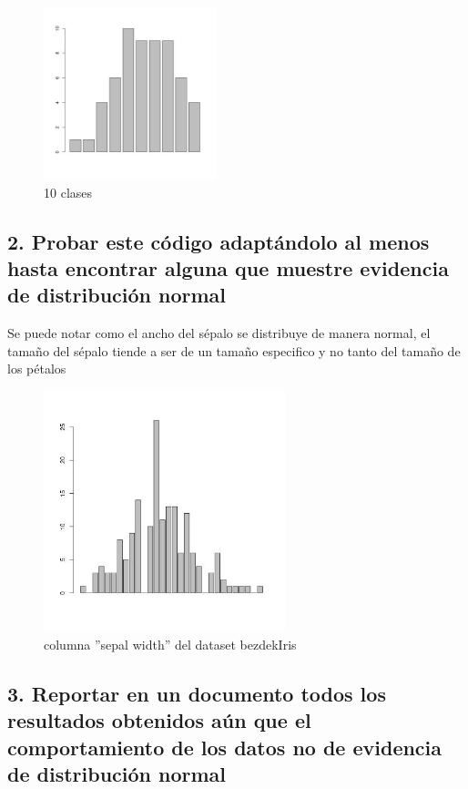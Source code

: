 \documentclass[10pt]{article}
\begin{document}
\begin{figure}[htbp]
\centering
\includegraphics[width=5cm]{img/e4.jpeg}
\caption{10 clases}
\end{figure}

\subsection*{2. Probar este código adaptándolo al menos hasta encontrar alguna que muestre evidencia de distribución normal}
\label{sec:org594c6d0}

Se puede notar como el ancho del sépalo se distribuye de manera normal, el tamaño del sépalo tiende a ser de un tamaño especifico y no tanto del tamaño de los pétalos 

\begin{figure}[htbp]
\centering
\includegraphics[width=7cm]{img/iris.jpeg}
\caption{columna ''sepal width'' del dataset bezdekIris}
\end{figure}

\subsection*{3. Reportar en un documento todos los resultados obtenidos aún que el comportamiento de los datos no de evidencia de distribución normal}
\label{sec:orgbaa9c33}
\end{document}
